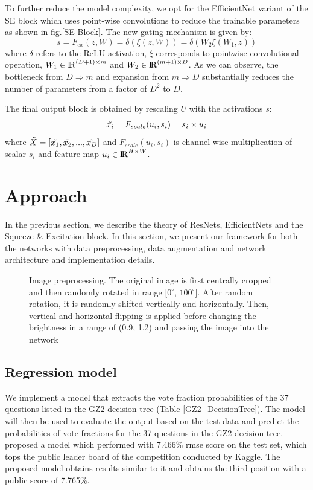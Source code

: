 \documentclass[fleqn,usenatbib]{mnras}
\begin{document}
To further reduce the model complexity, we opt for the EfficientNet variant of the SE block which uses point-wise convolutions to reduce the trainable parameters as shown in fig.\ref{SE Block}. The new gating mechanism is given by:
\begin{equation}
    s = F_{ex}(z, W) = \delta(\xi(z, W)) = \delta(W_2 \xi (W_1, z))
\end{equation}
where $\delta$ refers to the ReLU activation, $\xi$ corresponds to pointwise convolutional operation, $W_1 \in {\rm I\!R}^{(D+1) \times m}$ and $W_2 \in {\rm I\!R}^{(m+1) \times D}$. As we can observe, the bottleneck from $D \Rightarrow m$ and expansion from $m \Rightarrow D$ substantially reduces the number of parameters from a factor of $D^2$ to $D$.

The final output block is obtained by rescaling $U$ with the activations $s$:
\begin{equation}
    \Tilde{x_i} = F_{scale}(u_i,s_i) = s_i \times u_i
\end{equation}
where $\Tilde{X}=[\Tilde{x_1}, \Tilde{x_2}, ...,\Tilde{x_D}]$ and $F_{scale}(u_i,s_i)$ is channel-wise multiplication of scalar $s_i$ and feature map $u_i \in {\rm I\!R}^{H \times W}$.

\section{Approach}
\hspace{0.25 in}In the previous section, we describe the theory of ResNets, EfficientNets and the Squeeze \& Excitation block. In this section, we present our framework for both the networks with data preprocessing, data augmentation and network architecture and implementation details.
\begin{figure}
    \centering
    
    \caption{Image preprocessing. The original image is first centrally cropped and then randomly rotated in range [$0^\circ$, $100^\circ$]. After random rotation, it is randomly shifted vertically and horizontally. Then, vertical and horizontal flipping is applied before changing the brightness in a range of (0.9, 1.2) and passing the image into the network}
    \label{fig: Data_augment}
\end{figure}
\subsection{Regression model}
\hspace{0.25 in}We implement a model that extracts the vote fraction probabilities of the 37 questions listed in the GZ2 decision tree (Table \ref{GZ2_DecisionTree}). The model will then be used to evaluate the output based on the test data and predict the probabilities of vote-fractions for the 37 questions in the GZ2 decision tree. \citet{Dieleman2015} proposed a model which performed with 7.466\% rmse score on the test set, which tops the public leader board of the competition conducted by Kaggle. The proposed model obtains results similar to it and obtains the third position with a public score of 7.765\%.
\end{document}
